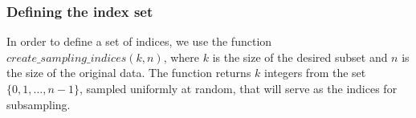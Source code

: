 \documentclass[11pt]{scrartcl} %
\begin{document}
\subsubsection{Defining the index set}
In order to define a set of indices, we use the function
$create\_sampling\_indices(k, n)$, where $k$ is the size of the desired subset
and $n$ is the size of the original data. The function returns $k$ integers from the set
$\{0, 1, \hdots, n-1\}$, sampled uniformly at random, that will serve as the indices for subsampling.

% 
% 
\end{document}
